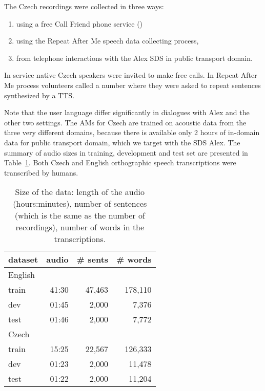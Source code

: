 The Czech recordings were collected in three ways\cite{korvas_2014}:
\begin{enumerate}
    \item using a free Call Friend phone service ()
    \item using the Repeat After Me speech data collecting process,
    \item from telephone interactions with the Alex \ac{SDS} in public transport domain.
\end{enumerate}

In  service native Czech speakers were invited to make free calls.
In Repeat After Me process volunteers called a number where they were asked to repeat 
sentences synthesized by a \ac{TTS}.

Note that the user language differ significantly in dialogues with Alex and the other two settings.
The \acp{AM} for Czech are trained on acoustic data from the three very different domains, because there is available only 2 hours of in-domain data for public transport domain, which we target with the \ac{SDS} Alex.
The summary of audio sizes in training, development and test set are presented in Table~\ref{tab:audio}.
Both Czech and English orthographic speech transcriptions were transcribed by humans.

\begin{table}[hbp]
    \centering
    \begin{tabular}{lrrr}
        \hline
            dataset & audio & \# sents & \# words \\
        \hline
            English & & & \\
                train & 41:30 & 47,463 & 178,110 \\
                dev & 01:45 & 2,000 & 7,376 \\
                test & 01:46 & 2,000 & 7,772 \\
        \hline
            Czech & & & \\
                train & 15:25 & 22,567 & 126,333 \\
                dev & 01:23 & 2,000 & 11,478 \\
                test & 01:22 & 2,000 & 11,204 \\
        \hline
		\end{tabular}
    \caption{Size of the data: length of the audio (hours:minutes), number of sentences
        (which is the same as the number of recordings), number of words in the 
    transcriptions.\cite{korvas_2014}}
    \label{tab:audio}
\end{table}


